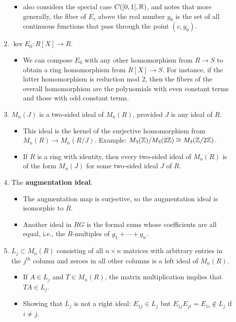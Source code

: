 \documentclass[../notes.tex]{subfiles}
\begin{document}
\begin{itemize}
\begin{enumerate}
\begin{itemize}
            \item \textcite{bib:DummitFoote} also considers the special case $C([0,1],\mathbb{R})$, and notes that more generally, the fiber of $E_c$ above the real number $y_0$ is the set of all continuous functions that pass through the point $(c,y_0)$.
        \end{itemize}
        \item $\ker E_0:R[X]\to R$.
        \begin{itemize}
            \item We can compose $E_0$ with any other homomorphism from $R\to S$ to obtain a ring homomorphism from $R[X]\to S$. For instance, if the latter homomorphism is reduction mod 2, then the fibers of the overall homomorphism are the polynomials with even constant terms and those with odd constant terms.
        \end{itemize}
        \item $M_n(J)$ is a two-sided ideal of $M_n(R)$, provided $J$ is any ideal of $R$.
        \begin{itemize}
            \item This ideal is the kernel of the surjective homomorphism from $M_n(R)\to M_n(R/J)$. Example: $M_3(\mathbb{Z})/M_3(2\mathbb{Z})\cong M_3(\mathbb{Z}/2\mathbb{Z})$.
            \item If $R$ is a ring with identity, then every two-sided ideal of $M_n(R)$ is of the form $M_n(J)$ for some two-sided ideal $J$ of $R$.
        \end{itemize}
        \item The \textbf{augmentation ideal}.
        \begin{itemize}
            \item The augmentation map is surjective, so the augmentation ideal is isomorphic to $R$.
            \item Another ideal in $RG$ is the formal sums whose coefficients are all equal, i.e., the $R$-multiples of $g_1+\cdots+g_n$.
        \end{itemize}
        \item $L_j\subset M_n(R)$ consisting of all $n\times n$ matrices with arbitrary entries in the $j^\text{th}$ column and zeroes in all other columns is a left ideal of $M_n(R)$.
        \begin{itemize}
            \item If $A\in L_j$ and $T\in M_n(R)$, the matrix multiplication implies that $TA\in L_j$.
            \item Showing that $L_j$ is not a right ideal: $E_{1j}\in L_j$ but $E_{1j}E_{ji}=E_{1i}\notin L_j$ if $i\neq j$.

\end{itemize}
\end{enumerate}
\end{itemize}
\end{document}
